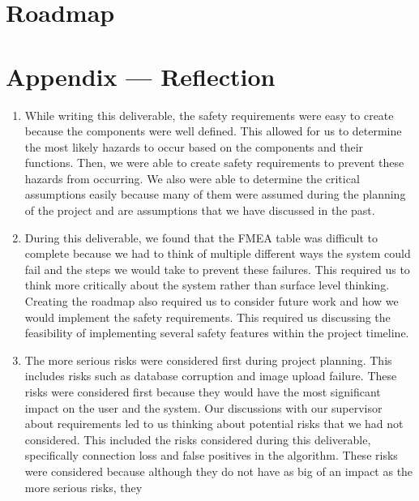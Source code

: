 \documentclass{article}
\begin{document}

\section{Roadmap}


\newpage{}

\section*{Appendix --- Reflection}

\begin{enumerate}
    \item While writing this deliverable, the safety requirements were easy to create because the components were well defined. This allowed for us to determine the most likely hazards to occur based on the
    components and their functions. Then, we were able to create safety requirements to prevent these hazards from occurring. We also were able to determine the critical assumptions easily because many of
    them were assumed during the planning of the project and are assumptions that we have discussed in the past.
    \item During this deliverable, we found that the FMEA table was difficult to complete because we had to think of multiple different ways the system could fail and the steps we would take to prevent these failures. This
    required us to think more critically about the system rather than surface level thinking. Creating the roadmap also required us to consider future work and how we would implement the safety requirements. This required us
    discussing the feasibility of implementing several safety features within the project timeline.
    \item The more serious risks were considered first during project planning. This includes risks such as database corruption and image upload failure. These risks were considered first because they would have the most
    significant impact on the user and the system. Our discussions with our supervisor about requirements led to us thinking about potential risks that we had not considered. This included the risks considered 
    during this deliverable, specifically connection loss and false positives in the algorithm. These risks were considered because although they do not have as big of an impact as the more serious risks, they 

\end{enumerate}
\end{document}
